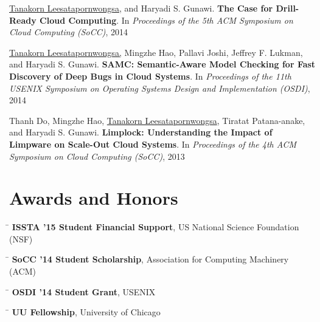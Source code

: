 \documentclass[10pt]{article} %
\begin{document}
\underline{Tanakorn Leesatapornwongsa,} and Haryadi S. Gunawi. \textbf{The Case
for Drill-Ready Cloud Computing}. In \textit{Proceedings of the 5th ACM
Symposium on Cloud Computing (SoCC)}, 2014
\vspace{2mm}

\underline{Tanakorn Leesatapornwongsa,} Mingzhe Hao, Pallavi Joshi, Jeffrey F.
Lukman, and Haryadi S. Gunawi. \textbf{SAMC: Semantic-Aware Model Checking for
Fast Discovery of Deep Bugs in Cloud Systems}. In \textit{Proceedings of the
11th USENIX Symposium on Operating Systems Design and Implementation (OSDI)},
2014
\vspace{2mm}

Thanh Do, Mingzhe Hao, \underline{Tanakorn Leesatapornwongsa}, Tiratat
Patana-anake, and Haryadi S. Gunawi. \textbf{Limplock: Understanding the Impact
of Limpware on Scale-Out Cloud Systems}. In \textit{Proceedings of the 4th ACM
Symposium on Cloud Computing (SoCC)}, 2013


\section{Awards and Honors}

\begin{tabbing}
\hspace{2.5cm} \=  \> \textbf{ISSTA '15 Student Financial Support}, US National Science Foundation (NSF)
\end{tabbing}

\begin{tabbing}
\hspace{2.5cm} \=  \> \textbf{SoCC '14 Student Scholarship}, Association for Computing Machinery (ACM)
\end{tabbing}

\begin{tabbing}
\hspace{2.5cm} \=  \> \textbf{OSDI '14 Student Grant}, USENIX
\end{tabbing}

\begin{tabbing}
\hspace{2.5cm} \=  \> \textbf{UU Fellowship}, University of Chicago
\end{tabbing}
\end{document}
